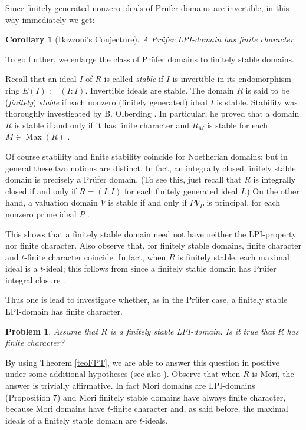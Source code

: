 \documentclass[12pt]{amsart}
\newtheorem{corollary}[theorem]{Corollary}
\newtheorem{Qu}{Problem}
\theoremstyle{definition}
\begin{document}
Since  finitely generated nonzero ideals of Pr\"ufer domains are invertible, in this way immediately we get:

\begin{corollary} [Bazzoni's Conjecture] A Pr\"ufer LPI-domain has finite character.
\end{corollary}

To go further, we enlarge the class of Pr\"ufer domains to finitely stable domains.

 Recall that an ideal $I$ of $R$ is  called \emph{stable} if $I$ is invertible in its endomorphism ring $E(I):=(I:I)$. Invertible ideals are stable.
The  domain $R$ is said to be (\emph{finitely}) \emph{stable} if each nonzero (finitely generated) ideal $I$ is stable. 
Stability was thoroughly investigated by B. Olberding  \cite{O3, O1, O2}. In particular, he proved that a domain $R$ is stable if and only if it has finite character and $R_M$ is stable for each $M\in \operatorname{Max}(R)$ \cite[Theorem 3.3]{O2}.

 Of course stability and finite stability coincide for Noetherian domains; but in general these two notions are distinct. In fact, an integrally closed finitely stable domain is precisely a  Pr\"ufer domain. (To see this, just recall that $R$ is integrally closed if and only if $R=(I:I)$ for each finitely generated ideal $I$.) On the other hand, a valuation domain $V$ is stable if and only if $PV_P$ is principal, for each nonzero prime ideal $P$ \cite[Proposition 4.1]{O3}.

This shows that a finitely stable domain need not have neither the LPI-property nor finite character. Also observe that, for finitely stable domains, finite character and $t$-finite character coincide.  
In fact, when $R$ is finitely stable, each maximal ideal is a $t$-ideal; this follows from \cite[Lemma 2.1 and  Theorem 2.4]{tlink} since a finitely stable domain has Pr\"ufer integral closure \cite[Proposition 2.1]{Rush}. 

Thus  one is lead to investigate whether, as in the Pr\"ufer case, a finitely stable LPI-domain has finite character. 

\begin{Qu} \cite[Question 4.6]{B4} \label{LPI} Assume that $R$ is a finitely stable LPI-domain. Is it true that $R$ has finite character?
\end{Qu}

By using Theorem \ref{teoFPT}, we are able to answer this question in positive under some additional hypotheses (see also \cite{G}). 
Observe that when $R$ is Mori, the answer is  trivially affirmative.  In fact Mori domains are LPI-domains (Proposition 7) and Mori finitely stable domains have always finite character, because  Mori domains have $t$-finite character \cite[Theorem 3.3]{Bar} and, as said before, the maximal ideals of a finitely stable domain are $t$-ideals. 
\end{document}

